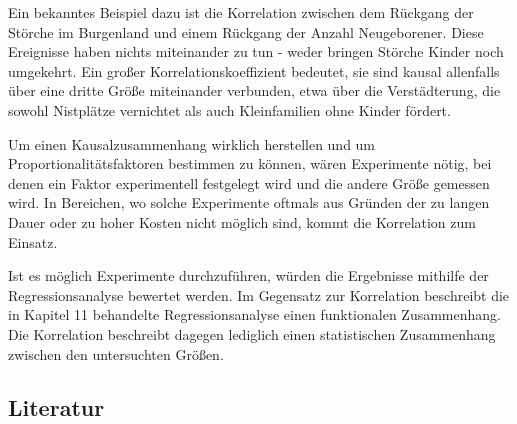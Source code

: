 \noindent Ein bekanntes Beispiel dazu ist die Korrelation zwischen dem R\"{u}ckgang der St\"{o}rche im Burgenland und einem R\"{u}ckgang der Anzahl Neugeborener. Diese Ereignisse haben nichts miteinander zu tun - weder bringen St\"{o}rche Kinder noch umgekehrt. Ein gro{\ss}er Korrelationskoeffizient bedeutet, sie sind kausal allenfalls \"{u}ber eine dritte Gr\"{o}{\ss}e miteinander verbunden, etwa \"{u}ber die Verst\"{a}dterung, die sowohl Nistpl\"{a}tze vernichtet als auch Kleinfamilien ohne Kinder f\"{o}rdert.\newline

\noindent Um einen Kausalzusammenhang wirklich herstellen und um Proportionalit\"{a}tsfaktoren bestimmen zu k\"{o}nnen, w\"{a}ren Experimente n\"{o}tig, bei denen ein Faktor experimentell festgelegt wird und die andere Gr\"{o}{\ss}e gemessen wird. In Bereichen, wo solche Experimente oftmals aus Gr\"{u}nden der zu langen Dauer oder zu hoher Kosten nicht m\"{o}glich sind, kommt die Korrelation zum Einsatz. \newline

\noindent Ist es m\"{o}glich Experimente durchzuf\"{u}hren, w\"{u}rden die Ergebnisse mithilfe der Regressionsanalyse bewertet werden. Im Gegensatz zur Korrelation beschreibt die in Kapitel 11 behandelte Regressionsanalyse einen funktionalen Zusammenhang. Die Korrelation beschreibt dagegen lediglich einen statistischen Zusammenhang zwischen den untersuchten Gr\"{o}{\ss}en.

\clearpage

\subsection{Literatur}


